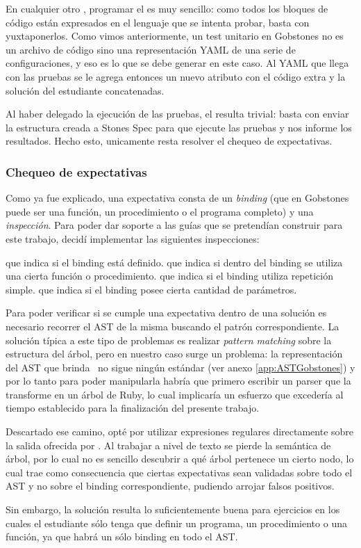 En cualquier otro \runner, programar el  es muy sencillo: como todos los bloques de código están expresados en el lenguaje que se intenta probar, basta con yuxtaponerlos. Como vimos anteriormente, un test unitario en Gobstones no es un archivo de código sino una representación YAML de una serie de configuraciones, y eso es lo que se debe generar en este caso. Al YAML que llega con las pruebas se le agrega entonces un nuevo atributo  con el código extra y la solución del estudiante concatenadas.

Al haber delegado la ejecución de las pruebas, el  resulta trivial: basta con enviar la estructura creada a Stones Spec para que ejecute las pruebas y nos informe los resultados. Hecho esto, unicamente resta resolver el chequeo de expectativas.

\subsubsection{Chequeo de expectativas}
Como ya fue explicado, una expectativa consta de un \emph{binding} (que en Gobstones puede ser una función, un procedimiento o el programa completo) y una \emph{inspección}. Para poder dar soporte a las guías que se pretendían construir para este trabajo, decidí implementar las siguientes inspecciones:

\begin{itemize}
   que indica si el binding está definido.
   que indica si dentro del binding se utiliza una cierta función o procedimiento.
   que indica si el binding utiliza repetición simple.
   que indica si el binding posee cierta cantidad de parámetros.
\end{itemize}

Para poder verificar si se cumple una expectativa dentro de una solución es necesario recorrer el AST de la misma buscando el patrón correspondiente. La solución típica a este tipo de problemas es realizar \emph{pattern matching} sobre la estructura del árbol, pero en nuestro caso surge un problema: la representación del AST que brinda \pyGob\ no sigue ningún estándar (ver anexo \ref{app:ASTGobstones}) y por lo tanto para poder manipularla habría que primero escribir un parser que la transforme en un árbol de Ruby, lo cual implicaría un esfuerzo que excedería al tiempo establecido para la finalización del presente trabajo.

Descartado ese camino, opté por utilizar expresiones regulares directamente sobre la salida ofrecida por \pyGob. Al trabajar a nivel de texto se pierde la semántica de árbol, por lo cual no es sencillo descubrir a qué árbol pertenece un cierto nodo, lo cual trae como consecuencia que ciertas expectativas sean validadas sobre todo el AST y no sobre el binding correspondiente, pudiendo arrojar falsos positivos.

Sin embargo, la solución resulta lo suficientemente buena para ejercicios en los cuales el estudiante sólo tenga que definir un programa, un procedimiento o una función, ya que habrá un sólo binding en todo el AST.
